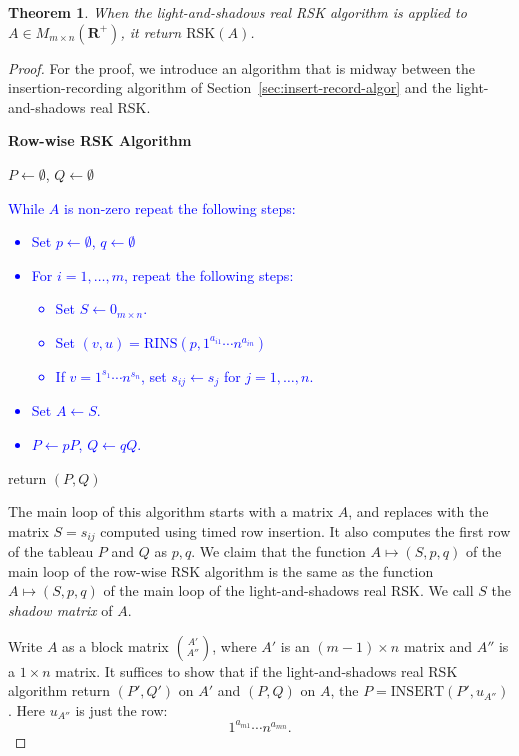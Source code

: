 \documentclass[10pt]{amsproc}
\newtheorem{theorem}{Theorem}[subsection]
\theoremstyle{definition}
\theoremstyle{remark}
\newcommand{\rowins}{\mathrm{RINS}}
\newcommand{\ins}{\mathrm{INSERT}}
\newcommand{\rp}{\mathbf{R}^+}
\newcommand{\rsk}{\mathrm{RSK}}
\newcommand{\ot}{\leftarrow}
\begin{document}
\begin{theorem}
  When the light-and-shadows real RSK algorithm is applied to $A\in M_{m\times n}(\rp)$, it return $\rsk(A)$.
\end{theorem}
\begin{proof}
  For the proof, we introduce an algorithm that is midway between the insertion-recording algorithm of Section~\ref{sec:insert-record-algor} and the light-and-shadows real RSK.
  \begin{center}
    \textbf{Row-wise RSK Algorithm}
  \end{center}
  \begin{itemize}
  \item $P\ot \emptyset$, $Q\ot \emptyset$
    \textcolor{blue}{
    \item While $A$ is non-zero repeat the following steps:
      \begin{itemize}
      \item Set $p\ot \emptyset$, $q\ot \emptyset$
      \item For $i=1,\dotsc,m$, repeat the following steps:
        \begin{itemize}
        \item Set $S\ot 0_{m\times n}$.
        \item Set $(v,u)=\rowins(p,1^{a_{i1}}\dotsb n^{a_{in}})$
        \item If $v=1^{s_1}\dotsb n^{s_n}$, set $s_{ij}\ot s_j$ for $j=1,\dotsc,n$.
        \end{itemize}
      \item Set $A\ot S$.
      \item $P\ot pP$, $Q\ot qQ$.
      \end{itemize}
      }
    \item return $(P, Q)$
  \end{itemize}
  The main loop of this algorithm starts with a matrix $A$, and replaces with the matrix $S=s_{ij}$ computed using timed row insertion.
  It also computes the first row of the tableau $P$ and $Q$ as $p, q$.
  We claim that the function $A\mapsto (S, p, q)$ of the main loop of the row-wise RSK algorithm is the same as the function $A\mapsto (S, p, q)$ of the main loop of the light-and-shadows real RSK.
  We call $S$ the \emph{shadow matrix} of $A$.

  Write $A$ as a block matrix $\binom{A'}{A''}$, where $A'$ is an $(m-1)\times n$ matrix and $A''$ is a $1\times n$ matrix.
  It suffices to show that if the light-and-shadows real RSK algorithm return $(P',Q')$ on $A'$ and $(P, Q)$ on $A$, the $P=\ins(P',u_{A''})$.
  Here $u_{A''}$ is just the row:
  \begin{displaymath}
    1^{a_{m1}}\dotsb n^{a_{mn}}.
  \end{displaymath}


\end{proof}
\end{document}
